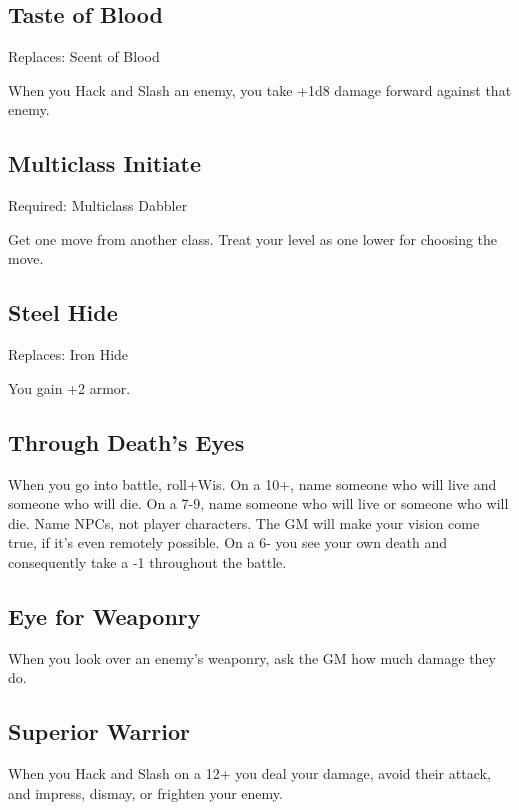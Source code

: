          
\subsection{Taste of Blood}    
         

Replaces: Scent of Blood

         

When you Hack and Slash an enemy, you take +1d8 damage forward against that enemy.

         
\subsection{Multiclass Initiate}    
         

Required: Multiclass Dabbler

         

Get one move from another class. Treat your level as one lower for choosing the move.

         
\subsection{Steel Hide}    
         

Replaces: Iron Hide

         

You gain +2 armor.

         
\subsection{Through Death's Eyes}    
         

When you go into battle, roll+Wis. On a 10+, name someone who will live and someone who will die. On a 7-9, name someone who will live or someone who will die. Name NPCs, not player characters. The GM will make your vision come true, if it's even remotely possible. On a 6- you see your own death and consequently take a -1 throughout the battle.

         
\subsection{Eye for Weaponry}    
         

When you look over an enemy's weaponry, ask the GM how much damage they do.

         
\subsection{Superior Warrior}    
         

When you Hack and Slash on a 12+ you deal your damage, avoid their attack, and impress, dismay, or frighten your enemy.

       

                
